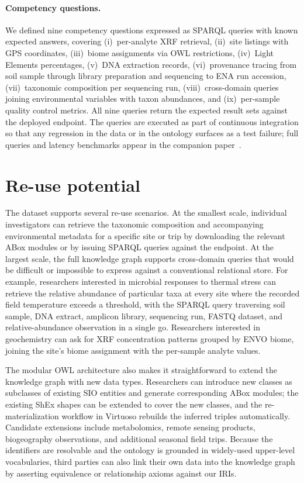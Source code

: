 \documentclass[11pt,a4paper]{article}
\begin{document}
\paragraph{Competency questions.}
We defined nine competency questions expressed as SPARQL queries with
known expected answers, covering (i)~per-analyte XRF retrieval,
(ii)~site listings with GPS coordinates, (iii)~biome assignments via
OWL restrictions, (iv)~Light Elements percentages, (v)~DNA extraction
records, (vi)~provenance tracing from soil sample through library
preparation and sequencing to ENA run accession, (vii)~taxonomic
composition per sequencing run, (viii)~cross-domain queries joining
environmental variables with taxon abundances, and (ix)~per-sample
quality control metrics. All nine queries return the expected result
sets against the deployed endpoint. The queries are executed as part
of continuous integration so that any regression in the data or in
the ontology surfaces as a test failure; full queries and latency
benchmarks appear in the companion paper~\cite{swj_companion}.

\section{Re-use potential}

The dataset supports several re-use scenarios. At the smallest scale,
individual investigators can retrieve the taxonomic composition and
accompanying environmental metadata for a specific site or trip by
downloading the relevant ABox modules or by issuing SPARQL queries
against the endpoint. At the largest scale, the full knowledge graph
supports cross-domain queries that would be difficult or impossible to
express against a conventional relational store. For example,
researchers interested in microbial responses to thermal stress can
retrieve the relative abundance of particular taxa at every site
where the recorded field temperature exceeds a threshold, with the
SPARQL query traversing soil sample, DNA extract, amplicon library,
sequencing run, FASTQ dataset, and relative-abundance observation in a
single go. Researchers interested in geochemistry can ask for XRF
concentration patterns grouped by ENVO biome, joining the site's
biome assignment with the per-sample analyte values.

The modular OWL architecture also makes it straightforward to extend
the knowledge graph with new data types. Researchers can introduce
new classes as subclasses of existing SIO entities and generate
corresponding ABox modules; the existing ShEx shapes can be extended
to cover the new classes, and the re-materialization workflow in
Virtuoso rebuilds the inferred triples automatically. Candidate
extensions include metabolomics, remote sensing products, biogeography
observations, and additional seasonal field trips. Because the
identifiers are resolvable and the ontology is grounded in widely-used
upper-level vocabularies, third parties can also link their own data
into the knowledge graph by asserting equivalence or relationship
axioms against our IRIs.
\end{document}
